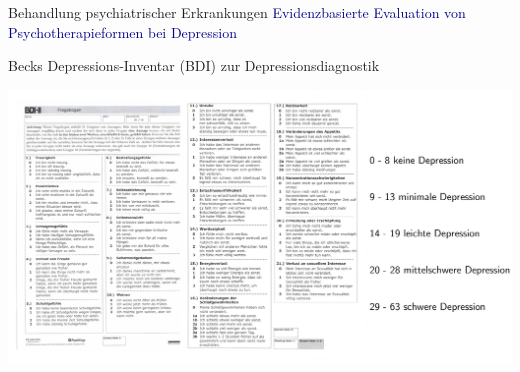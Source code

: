 \documentclass[
  8pt,
  ignorenonframetext,
]{beamer}
\begin{document}
\begin{frame}{Behandlung psychiatrischer Erkrankungen}
\protect\hypertarget{behandlung-psychiatrischer-erkrankungen-2}{}
\textcolor{darkblue}{Evidenzbasierte Evaluation von Psychotherapieformen bei Depression}

\normalsize

Becks Depressions-Inventar (BDI) zur Depressionsdiagnostik

\begin{center}\includegraphics[width=1\linewidth]{2_Abbildungen/pfm_2_bdi} \end{center}
\end{frame}
\end{document}
